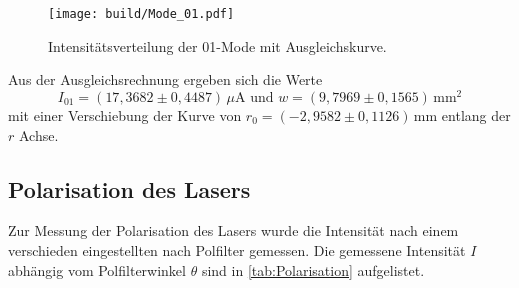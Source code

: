 \begin{figure}[h]
    \centering
    \texttt{[image: build/Mode\_01.pdf]}
    \caption{Intensitätsverteilung der 01-Mode mit Ausgleichskurve.}
    \label{fig:Mode_01}
\end{figure}
Aus der Ausgleichsrechnung ergeben sich die Werte 
\begin{equation*}
    I_{01} = (17{,}3682 \pm 0{,}4487) \, \unit{\mu\ampere} \,\, \text{und} \,\, w = (9{,}7969 \pm 0{,}1565) \, \unit{\milli\meter\squared}
\end{equation*}
mit einer Verschiebung der Kurve von $r_0 = (-2{,}9582 \pm 0{,}1126)\, \unit{\milli\meter}$ entlang der $r$ Achse.
\FloatBarrier 

\subsection{Polarisation des Lasers}
Zur Messung der Polarisation des Lasers wurde die Intensität nach einem verschieden eingestellten nach Polfilter gemessen. Die gemessene Intensität $I$ abhängig vom Polfilterwinkel $\theta$ sind in \autoref{tab:Polarisation} aufgelistet. 

